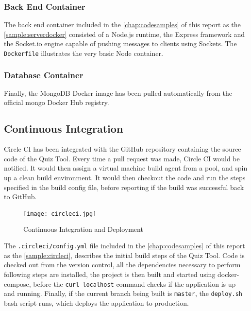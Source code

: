 \subsubsection{Back End Container}
The back end container included in the \autoref{chap:codesamples} of this report
as the \autoref{sample:serverdocker} consisted of a Node.js runtime, the Express framework and the Socket.io
engine capable of pushing messages to clients using Sockets. The \texttt{Dockerfile} illustrates
the very basic Node container.

\subsubsection{Database Container}
Finally, the MongoDB Docker image has been pulled automatically from the official mongo
Docker Hub registry\cite{36}.

\subsection{Continuous Integration}
\label{subsection:ci}
Circle CI has been integrated with the GitHub repository containing the source code of the
Quiz Tool. Every time a pull request was made, Circle CI would be notified. It would then
assign a virtual machine build agent from a pool, and spin up a clean build environment.
It would then checkout the code and run the steps specified in the build config file, before
reporting if the build was successful back to GitHub.

\begin{figure}[ht]
    \centering
    \texttt{[image: circleci.jpg]}
    \caption{Continuous Integration and Deployment}
    \label{fig:ci}
\end{figure}

The \texttt{.circleci/config.yml} file included in the \autoref{chap:codesamples} of this report
as the \autoref{sample:circleci}, describes the initial build steps of the Quiz Tool.
Code is checked out from the version control, all the dependencies necessary to perform following
steps are installed, the project is then built and started using docker-compose, before the
\texttt{curl localhost} command checks if the application is up and running. Finally, if
the current branch being built is \texttt{master}, the \texttt{deploy.sh} bash script runs, which
deploys the application to production.

